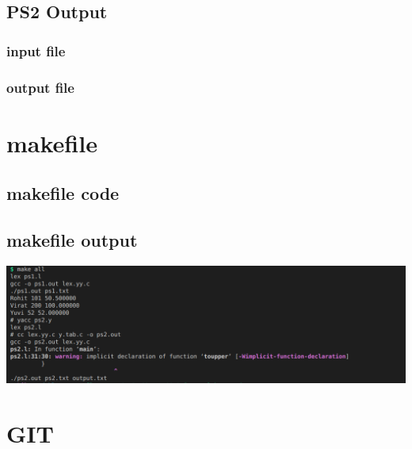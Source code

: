 \documentclass{article}
\begin{document}
    \pagebreak
    \subsection{PS2 Output }
    \subsubsection{input file}
    
    \subsubsection{output file}
    
    \pagebreak
    \section{makefile}
    \subsection{makefile code}
    
    \subsection{makefile output}
    \includegraphics[width=1.2\textwidth]{./images/mk_001.png}


    \section{GIT}
\end{document}
